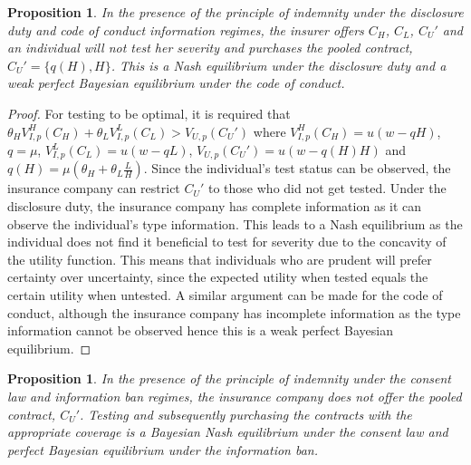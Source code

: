 \documentclass[nonatbib,preprint,12pt]{elsarticle}
\theoremstyle{plain}
\newtheorem{prop}[theorem]{Proposition}
\theoremstyle{definition}
\theoremstyle{plain}
\theoremstyle{TheoremNum}
\theoremstyle{CorollaryNum}
\theoremstyle{PropositionNum}
\theoremstyle{TheoremNum}
\begin{document}
\setcounter{theorem}{5}
\renewcommand{\thetheorem}{\arabic{theorem}}
\begin{prop}\label{prop:noindemnitytestnoselect}
In the presence of the principle of indemnity under the disclosure duty and code of conduct information regimes, the insurer offers $C_H$, $C_L$, $C_U'$ and an individual will not test her severity and purchases the pooled contract, $C_U'=\{q(H),H\}$. This is a Nash equilibrium under the disclosure duty and a weak perfect Bayesian equilibrium under the code of conduct.
\end{prop}

\begin{proof}
For testing to be optimal, it is required that $\theta_H V_{I,p}^H (C_H) + \theta_L V_{I,p}^L (C_L) > V_{U,p}(C_U')$ where $V_{I,p}^H (C_H) = u(w-qH)$, $q=\mu$, $V_{I,p}^L (C_L) = u(w-qL)$, $ V_{U,p}(C_U') = u(w-q(H)H)$ and $q(H)= \mu(\theta_H + \theta_L \frac{L}{H})$. Since the individual's test status can be observed, the insurance company can restrict $C_U'$ to those who did not get tested. Under the disclosure duty, the insurance company has complete information as it can observe the individual's type information. This leads to a Nash equilibrium as the individual does not find it beneficial to test for severity due to the concavity of the utility function. This means that individuals who are prudent will prefer certainty over uncertainty, since the expected utility when tested equals the certain utility when untested. A similar argument can be made for the code of conduct, although the insurance company has incomplete information as the type information cannot be observed hence this is a weak perfect Bayesian equilibrium.
\end{proof}

\begin{prop}
In the presence of the principle of indemnity under the consent law and information ban regimes, the insurance company does not offer the pooled contract, $C_U'$. Testing and subsequently purchasing the contracts with the appropriate coverage is a Bayesian Nash equilibrium under the consent law and perfect Bayesian equilibrium under the information ban.
\end{prop}
\end{document}
